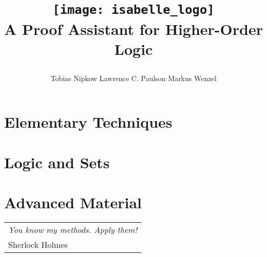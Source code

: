\documentclass{article}
\begin{document}
\title{
\begin{center}
\texttt{[image: isabelle\_logo]}
       \\ \vspace{0.5cm} A Proof Assistant for Higher-Order Logic
\end{center}}
\author{Tobias Nipkow \quad Lawrence C. Paulson \quad Markus Wenzel%
}
\maketitle
\newpage




\tableofcontents

\cleardoublepage{}

\part{Elementary Techniques}




\part{Logic and Sets}




\part{Advanced Material}




\markboth{}{}
\cleardoublepage
\vspace*{\fill}
\begin{flushright}
\begin{tabular}{l}
{\large\sf\slshape You know my methods. Apply them!}\\[1ex]
Sherlock Holmes
\end{tabular}
\end{flushright}
\vspace*{\fill}
\vspace*{\fill}

\underscoreoff





\underscoreoff
\printindex
\end{document}
